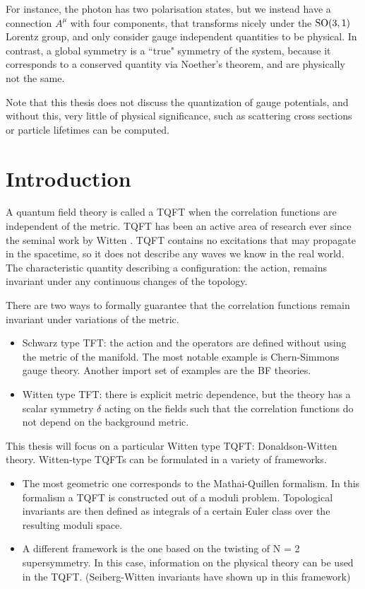For instance, the photon has two polarisation states, but we instead have a
connection $A^{\mu}$ with four components, that transforms nicely under the
$\operatorname{SO}(3,1)$ Lorentz group, and only consider gauge independent
quantities to be physical. In contrast, a global symmetry is a ``true" symmetry
of the system, because it corresponds to a conserved quantity via Noether's
theorem, and are physically not the same.  

Note that this thesis does not discuss the quantization of gauge potentials, and
without this, very little of physical significance, such as scattering cross
sections or particle lifetimes can be computed. %

\section{Introduction}

A quantum field theory is called a TQFT when the correlation functions are
independent of the metric. 
TQFT has been an active area of research ever since the seminal work by Witten
\cite{wittenTQFT}. TQFT contains no excitations that may propagate in the
spacetime, so it does not describe any waves we know in the real world. The
characteristic quantity describing a configuration: the action, remains
invariant under any continuous changes of the topology. 

There are two ways to formally guarantee that the correlation functions remain
invariant under variations of the metric. %
\begin{itemize}
	\item Schwarz type TFT: the action and the operators are defined without 
		using the metric of the manifold. The most notable example is
		Chern-Simmons gauge theory. Another import set of examples are the BF
		theories. 
	\item Witten type TFT: there is explicit metric
	dependence, but the theory has a scalar symmetry $\delta$ acting on
	the fields such that the correlation
	functions do not depend on the background metric. 
\end{itemize}

This thesis will focus on a particular Witten type TQFT: Donaldson-Witten
theory. Witten-type TQFTs can be formulated in a variety of frameworks. 
\begin{itemize}
	\item 
 The most geometric one corresponds to the Mathai-Quillen formalism. In this
formalism a TQFT is constructed out of a moduli problem. Topological invariants
are then defined as integrals of a certain Euler class over the resulting moduli
space.\cite{cernTQFT}
	\item 
 A different framework is the one based on the twisting of N = 2 supersymmetry.
In this case, information on the physical theory can be used in the
TQFT. (Seiberg-Witten invariants have shown up in this framework)
\end{itemize}

